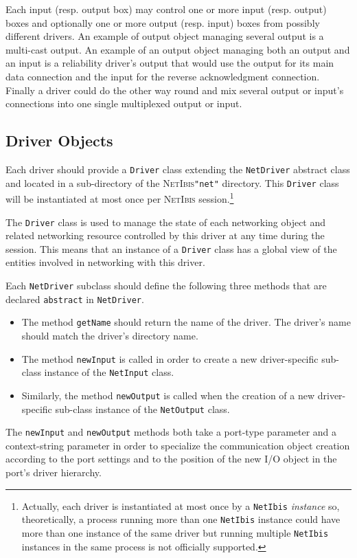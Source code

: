 \documentclass[11pt]{book}
\def\NetIbis{\textsc{NetIbis}\xspace}
\begin{document}
Each input (resp. output box) may control one or more input (resp.
output) boxes and optionally one or more output (resp. input) boxes
from possibly different drivers. An example of output object managing
several output is a multi-cast output. An example of an output object
managing both an output and an input is a reliability driver's output
that would use the output for its main data connection and the input
for the reverse acknowledgment connection. Finally a driver could do
the other way round and mix several output or input's connections into
one single multiplexed output or input.

\subsection{Driver Objects}
\label{sec:driver-objects}

Each driver should provide a \texttt{Driver} class extending the
\texttt{NetDriver} abstract class and located in a sub-directory of
the \NetIbis \texttt{"net"} directory. This \texttt{Driver} class will
be instantiated at most once per \NetIbis session.\footnote{Actually,
  each driver is instantiated at most once by a \texttt{NetIbis} \emph{instance}
  so, theoretically, a process running more than one \texttt{NetIbis}
  instance could have more than one instance of the same driver but
  running multiple \texttt{NetIbis} instances in the same process is
  not officially supported.}

The \texttt{Driver} class is used to manage the state of each
networking object and related networking resource controlled by this
driver at any time during the session. This means that an instance of a
\texttt{Driver} class has a global view of the entities involved in
networking with this driver.

Each \texttt{NetDriver} subclass should define the following three
methods that are declared \texttt{abstract} in \texttt{NetDriver}.
\begin{itemize}

\item The method \texttt{getName} should return the name of the
  driver. The driver's name should match the driver's directory name.

\item The method \texttt{newInput} is called in order to create a new
  driver-specific sub-class instance of the \texttt{NetInput} class.

\item Similarly, the method \texttt{newOutput} is called when the
  creation of a new driver-specific sub-class instance of the
  \texttt{NetOutput} class.

\end{itemize}
The \texttt{newInput} and \texttt{newOutput} methods both take a
port-type parameter and a context-string parameter in order to
specialize the communication object creation according to the port
settings and to the position of the new I/O object in the port's driver
hierarchy.
\end{document}
